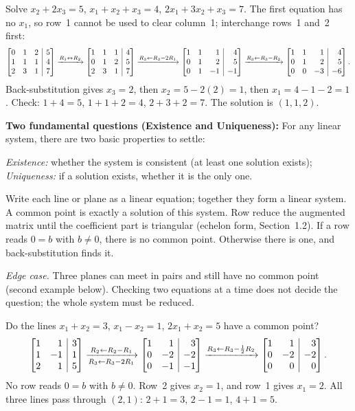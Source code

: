 \documentclass[10pt]{scrartcl}
\makeatletter
\newcommand{\aug}[2]{\left[\begin{array}{@{}#1@{}}#2\end{array}\right]}
\makeatother
\begin{document}
\begin{example*}
Solve $x_2+2x_3=5$, $x_1+x_2+x_3=4$, $2x_1+3x_2+x_3=7$. The first equation has no $x_1$, so row~1 cannot be used to clear column~1; interchange rows~1 and~2 first:
\[
  \aug{rrr|r}{0&1&2&5\\1&1&1&4\\2&3&1&7}
  \xrightarrow{R_1\leftrightarrow R_2}
  \aug{rrr|r}{1&1&1&4\\0&1&2&5\\2&3&1&7}
  \xrightarrow{R_3\leftarrow R_3-2R_1}
  \aug{rrr|r}{1&1&1&4\\0&1&2&5\\0&1&-1&-1}
  \xrightarrow{R_3\leftarrow R_3-R_2}
  \aug{rrr|r}{1&1&1&4\\0&1&2&5\\0&0&-3&-6}.
\]
Back-substitution gives $x_3=2$, then $x_2=5-2(2)=1$, then $x_1=4-1-2=1$. Check: $1+4=5$, $1+1+2=4$, $2+3+2=7$. The solution is $(1,1,2)$.
\end{example*}

\textbf{Two fundamental questions (Existence and Uniqueness):} For any linear system, there are two basic properties to settle:
\begin{enumerate}[(1)]
  \ii \emph{Existence:} whether the system is consistent (at least one solution exists);
  \ii \emph{Uniqueness:} if a solution exists, whether it is the only one.
\end{enumerate}

\begin{steps}
  \ii Write each line or plane as a linear equation; together they form a linear system. A common point is exactly a solution of this system.
  \ii Row reduce the augmented matrix until the coefficient part is triangular (echelon form, Section~1.2).
  \ii If a row reads $0=b$ with $b\ne0$, there is no common point. Otherwise there is one, and back-substitution finds it.
\end{steps}
\emph{Edge case.} Three planes can meet in pairs and still have no common point (second example below). Checking two equations at a time does not decide the question; the whole system must be reduced.

\begin{example*}
Do the lines $x_1+x_2=3$, $x_1-x_2=1$, $2x_1+x_2=5$ have a common point?
\[
  \aug{rr|r}{1&1&3\\1&-1&1\\2&1&5}
  \xrightarrow[R_3\leftarrow R_3-2R_1]{R_2\leftarrow R_2-R_1}
  \aug{rr|r}{1&1&3\\0&-2&-2\\0&-1&-1}
  \xrightarrow{R_3\leftarrow R_3-\frac12R_2}
  \aug{rr|r}{1&1&3\\0&-2&-2\\0&0&0}.
\]
No row reads $0=b$ with $b\ne0$. Row~2 gives $x_2=1$, and row~1 gives $x_1=2$. All three lines pass through $(2,1)$: $2+1=3$, $2-1=1$, $4+1=5$.
\end{example*}
\end{document}
